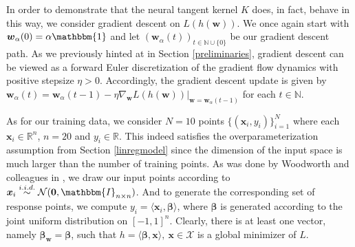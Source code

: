 \documentclass{article}
\begin{document}
In order to demonstrate that the neural tangent kernel $K$ does, in fact, behave in this way, we consider gradient descent on $L(h(\boldsymbol{w}))$.  We once again start with $\boldsymbol{w}_{\alpha}(0) = \alpha \mathbbm{1}$ and let $(\boldsymbol{w}_{\alpha}(t))_{t \in \mathbb{N}\cup \{0\}}$ be our gradient descent path. As we previously hinted at in Section \ref{preliminaries}, gradient descent can be viewed as a forward Euler discretization of the gradient flow dynamics with positive stepsize $\eta > 0$. Accordingly, the gradient descent update is given by $\boldsymbol{w}_{\alpha}(t) = \boldsymbol{w}_{\alpha}(t-1) - \eta \nabla_{\boldsymbol{w}} L(h(\boldsymbol{w}))|_{\boldsymbol{w} = \boldsymbol{w}_{\alpha}(t-1)}$ for each $t \in \mathbb{N}$.

As for our training data, we consider $N=10$ points $\{ (\boldsymbol{x}_i, y_i) \}_{i=1}^N$ where each $\boldsymbol{x}_i \in \mathbb{R}^{n}$, $n = 20$ and $y_i \in \mathbb{R}$. This indeed satisfies the overparameterization assumption from Section \ref{linregmodel} since the dimension of the input space is much larger than the number of training points. As was done by Woodworth and colleagues in \cite{woodworth2020kernel}, we draw our input points according to $\boldsymbol{x}_i \overset{i.i.d.}{\sim} \mathcal{N}(\boldsymbol{0}, \mathbbm{I}_{n \times n})$. And to generate the corresponding set of response points, we compute $y_i = \langle \boldsymbol{x}_i, \boldsymbol{\beta} \rangle$, where $\boldsymbol{\beta}$ is generated according to the joint uniform distribution on $[-1, 1]^n$. Clearly, there is at least one vector, namely $\boldsymbol{\beta}_{\boldsymbol{w}} = \boldsymbol{\beta}$, such that $h = \langle \boldsymbol{\beta}, \boldsymbol{x} \rangle, \ \boldsymbol{x} \in \mathcal{X}$ is a global minimizer of $L$.
\end{document}
